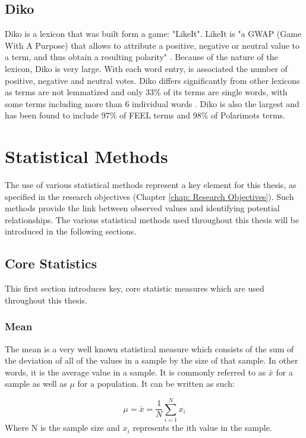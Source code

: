 \subsection{Diko}\label{chap: diko}

Diko is a lexicon that was built form a game: "LikeIt". LikeIt is "a GWAP (Game With A Purpose) that allows to attribute a positive, negative or neutral value to a term, and thus obtain a resulting polarity" \citep{lafourcade2015collecting}. Because of the nature of the lexicon, Diko is very large. With each word entry, is associated the number of positive, negative and neutral votes. Diko differs significantly from other lexicons as terms are not lemmatized and only 33\% of its terms are single words, with some terms including more than 6 individual words \citep{abdaoui2017feel}. Diko is also the largest and has been found to include 97\% of FEEL terms and 98\% of Polarimots terms.

\section{Statistical Methods}\label{Statistical Methods}

The use of various statistical methods represent a key element for this thesis, as specified in the research objectives (Chapter \ref{chap: Research Objectives}). Such methods provide the link between observed values and identifying potential relationships. The various statistical methods used throughout this thesis will be introduced in the following sections.

\subsection{Core Statistics}

This first section introduces key, core statistic measures which are used throughout this thesis.

\subsubsection{Mean}

The mean is a very well known statistical measure which consists of the sum of the deviation of all of the values in a sample by the size of that sample. In other words, it is the average value in a sample. It is commonly referred to as $\bar{x}$ for a sample as well as $\mu$ for a population. It can be written as such:

\begin{equation}
    \mu = \bar{x} = \frac{1}{N}\sum^{N}_{i=1} x_{i}
\end{equation}
Where N is the sample size and $x_{i}$ represents the ith value in the sample.

